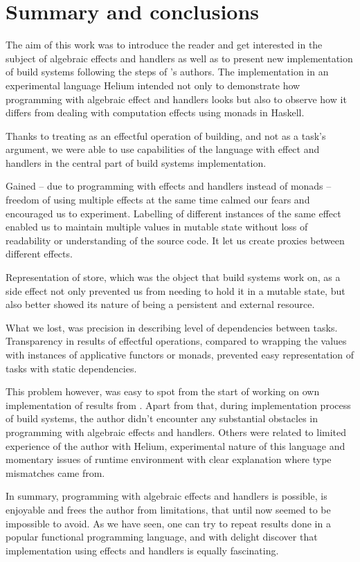 
\chapter{Summary and conclusions}

The aim of this work was to introduce the reader and get interested in the subject of algebraic effects and handlers as well as to present new implementation of build systems following the steps of \BSaLC{}'s authors. The implementation in an experimental language Helium intended not only to demonstrate how programming with algebraic effect and handlers looks but also to observe how it differs from dealing with computation effects using monads in Haskell.

Thanks to treating  as an effectful operation of building, and not as a task's argument, we were able to use capabilities of the language with effect and handlers in the central part of build systems implementation.

Gained -- due to programming with effects and handlers instead of monads -- freedom of using multiple effects at the same time calmed our fears and encouraged us to experiment. Labelling of different instances of the same effect enabled us to maintain multiple values in mutable state without loss of readability or understanding of the source code. It let us create proxies between different effects.

Representation of store, which was the object that build systems work on, as a side effect not only prevented us from needing to hold it in a mutable state, but also better showed its nature of being a persistent and external resource.

What we lost, was precision in describing level of dependencies between tasks. Transparency in results of effectful operations, compared to wrapping the values with instances of applicative functors or monads, prevented easy representation of tasks with static dependencies.

This problem however, was easy to spot from the start of working on own implementation of results from \BSaLC{}. Apart from that, during implementation process of build systems, the author didn't encounter any substantial obstacles in programming with algebraic effects and handlers. Others were related to limited experience of the author with Helium, experimental nature of this language and momentary issues of runtime environment with clear explanation where type mismatches came from.

In summary, programming with algebraic effects and handlers is possible, is enjoyable and frees the author from limitations, that until now seemed to be impossible to avoid. As we have seen, one can try to repeat results done in a popular functional programming language, and with delight discover that implementation using effects and handlers is equally fascinating.

